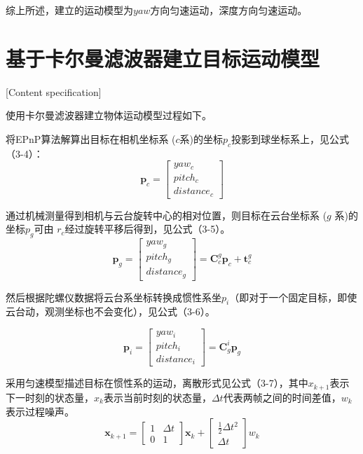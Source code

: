 综上所述，建立的运动模型为$yaw$方向匀速运动，深度方向匀速运动。

\section{基于卡尔曼滤波器建立目标运动模型}[Content specification]

使用卡尔曼滤波器建立物体运动模型过程如下。
\par
将EPnP算法解算出目标在相机坐标系 ($c$系)的坐标$p_c$投影到球坐标系上，见公式（3-4）：
\begin{equation} \boldsymbol p_c=\left[\begin{array}{c} yaw_c\\ pitch_c \\ distance_c \end{array}\right] \end{equation}
\par 
通过机械测量得到相机与云台旋转中心的相对位置，则目标在云台坐标系 ($g$ 系)的坐标$p_g$可由 $r_c$经过旋转平移后得到，见公式（3-5）。
\begin{equation} \boldsymbol p_g=\left[\begin{array}{c} yaw_g\\ pitch_g\\ distance_g \end{array}\right] =\boldsymbol C_{c}^{g}\boldsymbol p_c + \boldsymbol t_{c}^{g} \end{equation}
\par 
然后根据陀螺仪数据将云台系坐标转换成惯性系坐$p_i$（即对于一个固定目标，即使云台动，观测坐标也不会变化），见公式（3-6）。


\begin{equation} \boldsymbol p_i=\left[\begin{array}{c} yaw_i\\ pitch_i\\ distance_i \end{array}\right] =\boldsymbol C_{g}^{i}\boldsymbol p_g \end{equation}

\par
采用匀速模型描述目标在惯性系的运动，离散形式见公式（3-7），其中$x_{k+1}$表示下一时刻的状态量，$x_k$表示当前时刻的状态量，$\Delta t$代表两帧之间的时间差值，$w_k$表示过程噪声。
\begin{equation} \boldsymbol x_{k+1} =\left[\begin{array}{cc} {1} & \Delta t  \\ 0 & {1}  \end{array}\right]\boldsymbol x_{k} + \left[\begin{array}{c} {\frac{1}{2}\Delta t^2} \\ {\Delta t}  \end{array}\right]w_k \end{equation}



